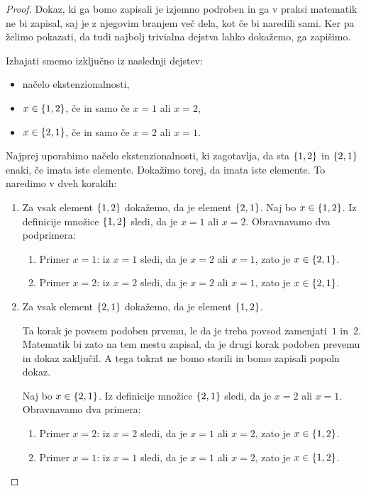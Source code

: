 \begin{proof}
  Dokaz, ki ga bomo zapisali je izjemno podroben in ga v praksi matematik ne bi zapisal,
  saj je z njegovim branjem več dela, kot če bi naredili sami. Ker pa želimo pokazati, da
  tudi najbolj trivialna dejstva lahko dokažemo, ga zapišimo.

  Izhajati smemo izključno iz naslednji dejstev:
  \begin{itemize}
  \item načelo ekstenzionalnosti,
  \item $x \in \set{1, 2}$, če in samo če $x = 1$ ali $x = 2$,
  \item $x \in \set{2, 1}$, če in samo če $x = 2$ ali $x = 1$.
  \end{itemize}
  Najprej uporabimo načelo ekstenzionalnosti, ki zagotavlja, da sta $\set{1, 2}$ in
  $\set{2, 1}$ enaki, če imata iste elemente. Dokažimo torej, da imata iste elemente. To
  naredimo v dveh korakih:
  \begin{enumerate}
  \item Za vsak element $\set{1, 2}$ dokažemo, da je element $\set{2, 1}$.
    Naj bo $x \in \set{1, 2}$. Iz definicije množice $\set{1, 2}$
    sledi, da je $x = 1$ ali $x = 2$. Obravnavamo dva podprimera:
    \begin{enumerate}
    \item Primer $x = 1$: iz $x = 1$ sledi, da je $x = 2$ ali $x = 1$, zato je $x \in \set{2, 1}$.
    \item Primer $x = 2$: iz $x = 2$ sledi, da je $x = 2$ ali $x = 1$, zato je $x \in \set{2, 1}$.
    \end{enumerate}
  \item Za vsak element $\set{2, 1}$ dokažemo, da je element $\set{1, 2}$.

    Ta korak je povsem podoben prvemu, le da je treba povsod zamenjati~$1$ in~$2$.
    Matematik bi zato na tem mestu zapisal, da je drugi korak podoben prevemu in dokaz
    zaključil. A tega tokrat ne bomo storili in bomo zapisali popoln dokaz.

    Naj bo $x \in \set{2, 1}$. Iz definicije množice $\set{2, 1}$ sledi, da je $x = 2$ ali
    $x = 1$. Obravnavamo dva primera:
    \begin{enumerate}
    \item Primer $x = 2$: iz $x = 2$ sledi, da je $x = 1$ ali $x = 2$, zato je $x \in \set{1, 2}$.
    \item Primer $x = 1$: iz $x = 1$ sledi, da je $x = 1$ ali $x = 2$, zato je $x \in \set{1, 2}$. \qedhere
    \end{enumerate}
  \end{enumerate}
\end{proof}

